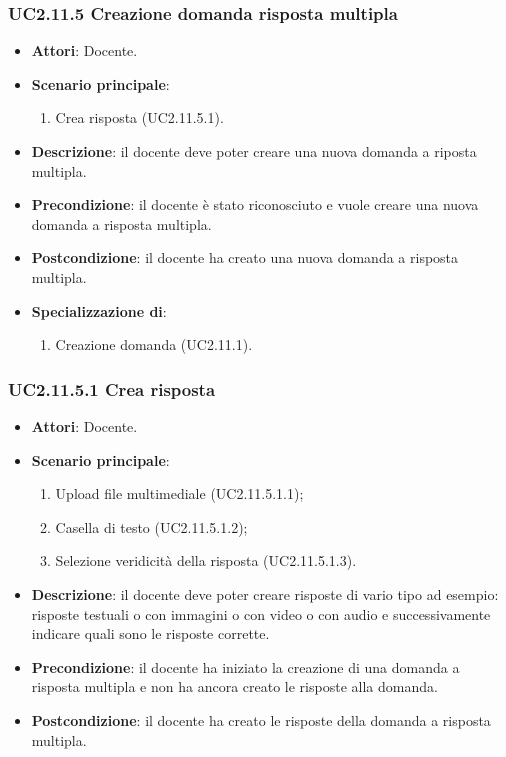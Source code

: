 \subsubsection{UC2.11.5 Creazione domanda risposta multipla}
\begin{itemize}
\item \textbf{Attori}: Docente.
\item \textbf{Scenario principale}:
\begin{enumerate}
\item Crea risposta (UC2.11.5.1).
\end{enumerate}
\item \textbf{Descrizione}: il docente deve poter creare una nuova domanda a riposta multipla.
\item \textbf{Precondizione}: il docente è stato riconosciuto e vuole creare una nuova domanda a risposta multipla.
\item \textbf{Postcondizione}: il docente ha creato una nuova domanda a risposta multipla.
\item \textbf{Specializzazione di}:
\begin{enumerate}
\item Creazione domanda (UC2.11.1).
\end{enumerate}
\end{itemize}
\subsubsection{UC2.11.5.1 Crea risposta}
\begin{itemize}
\item \textbf{Attori}: Docente.
\item \textbf{Scenario principale}:
\begin{enumerate}
\item Upload file multimediale (UC2.11.5.1.1);
\item Casella di testo (UC2.11.5.1.2);
\item Selezione veridicità della risposta (UC2.11.5.1.3).
\end{enumerate}
\item \textbf{Descrizione}: il docente deve poter creare risposte di vario tipo ad esempio: risposte testuali o con immagini o con video o con audio e successivamente indicare quali sono le risposte corrette.
\item \textbf{Precondizione}: il docente ha iniziato la creazione di una domanda a risposta multipla e non ha ancora creato le risposte alla domanda.
\item \textbf{Postcondizione}: il docente ha creato le risposte della domanda a risposta multipla.
\end{itemize}
